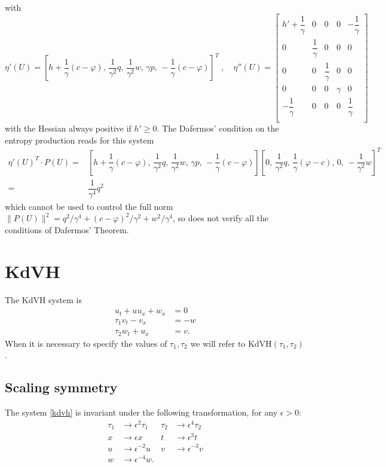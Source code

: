 \documentclass{article}
\theoremstyle{plain}
\theoremstyle{definition}
\numberwithin{theorem}{section}
\begin{document}
with
$$
\eta'(U)= [h+ \dfrac{1}{\gamma } (c-\varphi),\,  \dfrac{1}{\gamma^2 }q,\,  \dfrac{1}{\gamma^2 }w,\, \gamma p,\,    -\dfrac{1}{\gamma } (c-\varphi) ]^T\;,\quad 
\eta''(U) =   \left[\begin{array}{ccccc}
h' +\dfrac{1}{\gamma} &0&0&0&-\dfrac{1}{\gamma} \\
0 & \dfrac{1}{\gamma} &0&0&0\\
0 & 0&\dfrac{1}{\gamma} &0&0\\
0 & 0&0& \gamma &0\\
-\dfrac{1}{\gamma} & 0&0& 0 &\dfrac{1}{\gamma} \\
\end{array}
\right]
$$
with the Hessian always positive if $h'\ge 0$. The Dafermos' condition on the entropy production  reads for this system
$$
\begin{aligned}
\eta'(U)^T\cdot P(U) = &[h+ \dfrac{1}{\gamma } (c-\varphi),\,  \dfrac{1}{\gamma^2 }q,\,  \dfrac{1}{\gamma^2 }w,\, \gamma p,\,    -\dfrac{1}{\gamma } (c-\varphi) ]
[0,\,  \dfrac{1}{\gamma^2 }q,\,  \dfrac{1}{\gamma }(\varphi-c),\, 0,\,    -\dfrac{1}{\gamma^2 } w ]^T\\= &
 \dfrac{1}{\gamma^4 }q^2 
\end{aligned}
$$
which  cannot be used to control the full norm $\|P(U)\|^2 = q^2/\gamma^4 +(c-\varphi)^2/\gamma^2 +w^2/\gamma^4 $, so does not verify all the conditions of Dafermos' Theorem.



\section{KdVH}

The KdVH system is
\begin{subequations} \label{kdvh}
\begin{align}
    u_t + uu_x + w_x & = 0 \\
    \tau_1 v_t - v_x & = -w \\
    \tau_2 w_t + u_x & = v.
\end{align}
\end{subequations}
When it is necessary to specify the values of $\tau_1, \tau_2$ we will
refer to KdVH$(\tau_1,\tau_2)$.

\subsection{Scaling symmetry}
The system \eqref{kdvh} is invariant under the following
transformation, for any $\epsilon>0$:
\begin{subequations}
\label{eq:scaling}
\begin{align}
    \tau_1 & \to \epsilon^2 \tau_1 & \tau_2 & \to \epsilon^4 \tau_2 \\
    x & \to \epsilon x & t & \to \epsilon^3 t \\
    u & \to \epsilon^{-2} u & v & \to \epsilon^{-3} v \\
    w & \to \epsilon^{-4} w.
\end{align}
\end{subequations}
\end{document}
